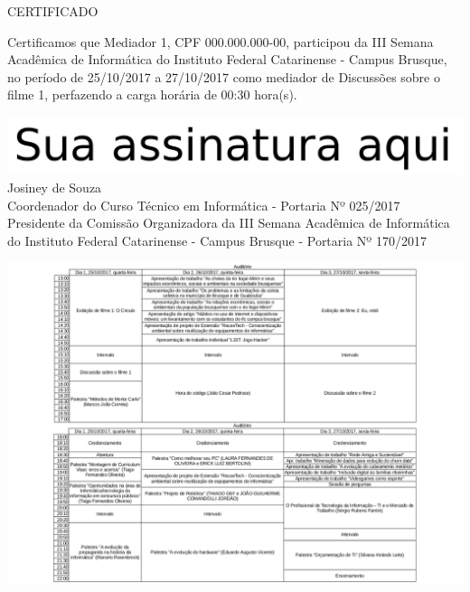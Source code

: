 \documentclass{abnt}
\begin{document}
\BgThispage
\color{black}
\bf
\begin{center}
    \Huge{CERTIFICADO}
\end{center}

Certificamos que Mediador 1, CPF 000.000.000-00, participou da III Semana Acadêmica de Informática do Instituto Federal Catarinense - Campus Brusque, no período de
25/10/2017 a 27/10/2017 como mediador de Discussões sobre o filme 1, perfazendo a carga horária de
00:30 hora(s).


\begin{center}
\includegraphics[scale=0.2]{../assinatura-pb.png}\\
Josiney de Souza\\
Coordenador do Curso Técnico em Informática - Portaria Nº 025/2017\\
Presidente da Comissão Organizadora da III Semana Acadêmica de Informática do Instituto Federal Catarinense - Campus Brusque - Portaria Nº 170/2017
\end{center}

\newpage
{}

\includegraphics[scale=0.85]{../juncao-grades.png}
\end{document}
